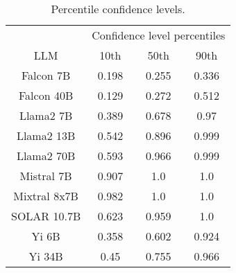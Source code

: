 \begin{table*}
\centering
\begin{tabular}{c|c|c|c}
& \multicolumn{3}{c}{Confidence level percentiles} \\ 
LLM & 10th & 50th & 90th\\ \hline
Falcon 7B & 0.198 & 0.255 & 0.336\\
Falcon 40B & 0.129 & 0.272 & 0.512\\
Llama2 7B & 0.389 & 0.678 & 0.97\\
Llama2 13B & 0.542 & 0.896 & 0.999\\
Llama2 70B & 0.593 & 0.966 & 0.999\\
Mistral 7B & 0.907 & 1.0 & 1.0\\
Mixtral 8x7B & 0.982 & 1.0 & 1.0\\
SOLAR 10.7B & 0.623 & 0.959 & 1.0\\
Yi 6B & 0.358 & 0.602 & 0.924\\
Yi 34B & 0.45 & 0.755 & 0.966\\
\hline
\end{tabular}
\caption{Percentile confidence levels.}
\label{tab:percentile_conf}
\end{table*}
